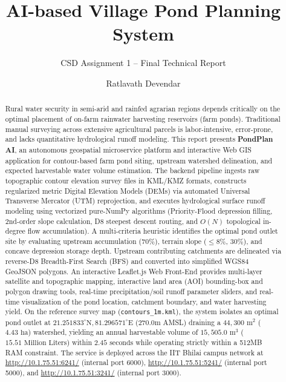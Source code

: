 \documentclass[manuscript,screen,review]{acmart}
\begin{document}
\title{AI-based Village Pond Planning System}
\subtitle{CSD Assignment 1 -- Final Technical Report}

\author{Ratlavath Devendar}

\renewcommand{\shortauthors}{Devendar et al.}

\begin{abstract}
Rural water security in semi-arid and rainfed agrarian regions depends critically on the optimal placement of on-farm rainwater harvesting reservoirs (farm ponds). Traditional manual surveying across extensive agricultural parcels is labor-intensive, error-prone, and lacks quantitative hydrological runoff modeling. This report presents \textbf{PondPlan AI}, an autonomous geospatial microservice platform and interactive Web GIS application for contour-based farm pond siting, upstream watershed delineation, and expected harvestable water volume estimation. The backend pipeline ingests raw topographic contour elevation survey files in KML/KMZ formats, constructs regularized metric Digital Elevation Models (DEMs) via automated Universal Transverse Mercator (UTM) reprojection, and executes hydrological surface runoff modeling using vectorized pure-NumPy algorithms (Priority-Flood depression filling, 2nd-order slope calculation, D8 steepest descent routing, and $O(N)$ topological in-degree flow accumulation). A multi-criteria heuristic identifies the optimal pond outlet site by evaluating upstream accumulation ($70\%$), terrain slope ($\le 8\%$, $30\%$), and concave depression storage depth. Upstream contributing catchments are delineated via reverse-D8 Breadth-First Search (BFS) and converted into simplified WGS84 GeoJSON polygons. An interactive Leaflet.js Web Front-End provides multi-layer satellite and topographic mapping, interactive land area (AOI) bounding-box and polygon drawing tools, real-time precipitation/soil runoff parameter sliders, and real-time visualization of the pond location, catchment boundary, and water harvesting yield. On the reference survey map (\texttt{contours\_1m.kml}), the system isolates an optimal pond outlet at $21.251833^\circ\text{N}, 81.296571^\circ\text{E}$ ($270.0\text{m}$ AMSL) draining a $44,300\text{ m}^2$ ($4.43\text{ ha}$) watershed, yielding an annual harvestable volume of $15,505.0\text{ m}^3$ ($15.51\text{ Million Liters}$) within $2.45\text{ seconds}$ while operating strictly within a 512MB RAM constraint. The service is deployed across the IIT Bhilai campus network at \url{http://10.1.75.51:6241/} (internal port 6000), \url{http://10.1.75.51:5241/} (internal port 5000), and \url{http://10.1.75.51:3241/} (internal port 3000).
\end{abstract}
\end{document}
